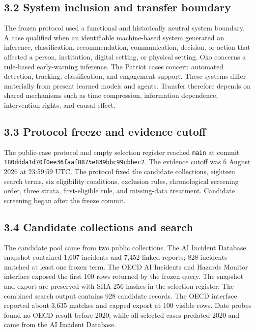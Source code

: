 \documentclass[11pt]{article}
\begin{document}
\subsection*{3.2 System inclusion and transfer boundary}
The frozen protocol used a functional and historically neutral system boundary. A case qualified when an identifiable machine-based system generated an inference, classification, recommendation, communication, decision, or action that affected a person, institution, digital setting, or physical setting. Oko concerns a rule-based early-warning inference. The Patriot cases concern automated detection, tracking, classification, and engagement support. These systems differ materially from present learned models and agents. Transfer therefore depends on shared mechanisms such as time compression, information dependence, intervention rights, and causal effect.
\subsection*{3.3 Protocol freeze and evidence cutoff}
The public-case protocol and empty selection register reached \texttt{main} at commit \texttt{180ddda1\allowbreak{}d70f0ee3\allowbreak{}6faaf887\allowbreak{}5e839bbc\allowbreak{}99cbbec2}. The evidence cutoff was 6 August 2026 at 23:59:59 UTC. The protocol fixed the candidate collections, eighteen search terms, six eligibility conditions, exclusion rules, chronological screening order, three strata, first-eligible rule, and missing-data treatment. Candidate screening began after the freeze commit.
\subsection*{3.4 Candidate collections and search}
The candidate pool came from two public collections. The AI Incident Database snapshot contained 1,607 incidents and 7,452 linked reports; 828 incidents matched at least one frozen term. The OECD AI Incidents and Hazards Monitor interface exposed the first 100 rows returned by the frozen query. The snapshot and export are preserved with SHA-256 hashes in the selection register. The combined search output contains 928 candidate records. The OECD interface reported about 3,635 matches and capped export at 100 visible rows. Date probes found no OECD result before 2020, while all selected cases predated 2020 and came from the AI Incident Database.
\end{document}
